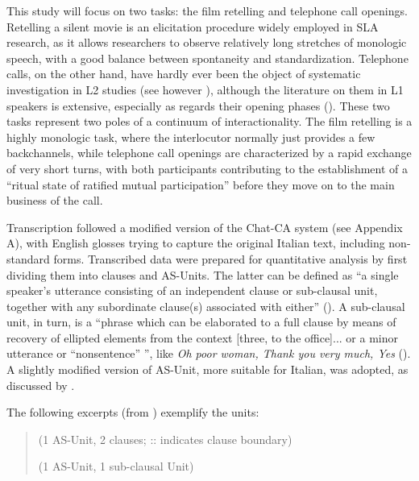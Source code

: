 \documentclass[output=paper]{langscibook}
\begin{document}
This study will focus on two tasks: the film retelling and telephone call openings. Retelling a silent movie is an elicitation procedure widely employed in SLA research, as it allows researchers to observe relatively long stretches of monologic speech, with a good balance between spontaneity and standardization. Telephone calls, on the other hand, have hardly ever been the object of systematic investigation in L2 studies (see however \citealt{NuzzoGauci2012, Thörle2016, FantLundell2019}), although the literature on them in L1 speakers is extensive, especially as regards their opening phases (\citealt{Schegloff1986, LukePavlidou2002}). These two tasks represent two poles of a continuum of interactionality. The film retelling is a highly monologic task, where the interlocutor normally just provides a few backchannels, while telephone call openings are characterized by a rapid exchange of very short turns, with both participants contributing to the establishment of a “ritual state of ratified mutual participation” \citep[100]{Goffman1963} before they move on to the main business of the call.

Transcription followed a modified version of the Chat-CA system (see Appendix A), with English glosses trying to capture the original Italian text, including non-standard forms. Transcribed data were prepared for quantitative analysis by first dividing them into clauses and AS-Units. The latter can be defined as “a single speaker’s utterance consisting of an independent clause or sub-clausal unit, together with any subordinate clause(s) associated with either” (\citealt[365]{FosterEtAl2000}).  A sub-clausal unit, in turn, is a “phrase which can be elaborated to a full clause by means of recovery of ellipted elements from the context [three, to the office]... or a minor utterance or “nonsentence” \citep{QuirkEtAl1985}”, like \textit{Oh poor woman, Thank you very much, Yes} (\citealt[366]{FosterEtAl2000}). A slightly modified version of AS-Unit, more suitable for Italian, was adopted, as discussed by \citet{Ferrari2020}.\largerpage

The following excerpts (from \citealt{FosterEtAl2000}) exemplify the units:

\begin{quote}
 (1 AS-Unit, 2 clauses; :: indicates clause boundary)

 (1 AS-Unit, 1 sub-clausal Unit) 
\end{quote}
\end{document}
